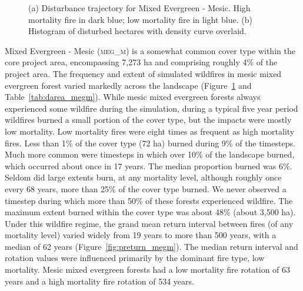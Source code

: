\begin{figure}[!htbp]
  \centering
  \caption{(a) \small Disturbance trajectory for Mixed Evergreen - Mesic. High mortality fire in dark blue; low mortality fire in light blue. (b) Histogram of disturbed hectares with density curve overlaid.} 
  \label{fig:darea_megm}
\end{figure}

Mixed Evergreen - Mesic (\textsc{meg\_m}) is a somewhat common cover type within the core project area, encompassing 7,273 ha and comprising roughly 4\% of the project area. The frequency and extent of simulated wildfires in mesic mixed evergreen forest varied markedly across the landscape (Figure~\ref{fig:darea_megm} and Table~\ref{tab:darea_megm}). %
%
While mesic mixed evergreen forests always experienced some wildfire during the simulation, during a typical five year period wildfires burned a small portion of the cover type, but the impacts were mostly low mortality. Low mortality fires were eight times as frequent as high mortality fires. Less than 1\% of the cover type (72 ha) burned during 9\% of the timesteps. Much more common were timesteps in which over 10\% of the landscape burned, which occurred about once in 17 years. The median proportion burned was 6\%. Seldom did large extents burn, at any mortality level, although roughly once every 68 years, more than 25\% of the cover type burned. We never observed a timestep during which more than 50\% of these forests experienced wildfire. The maximum extent burned within the cover type was about 48\% (about 3,500 ha). %
%
Under this wildfire regime, the grand mean return interval between fires (of any mortality level) varied widely from 19 years to more than 500 years, with a median of 62 years (Figure~\ref{fig:preturn_megm}). The median return interval and rotation values were influenced primarily by the dominant fire type, low mortality. Mesic mixed evergreen forests had a low mortality fire rotation of 63 years and a high mortality fire rotation of 534 years. %
